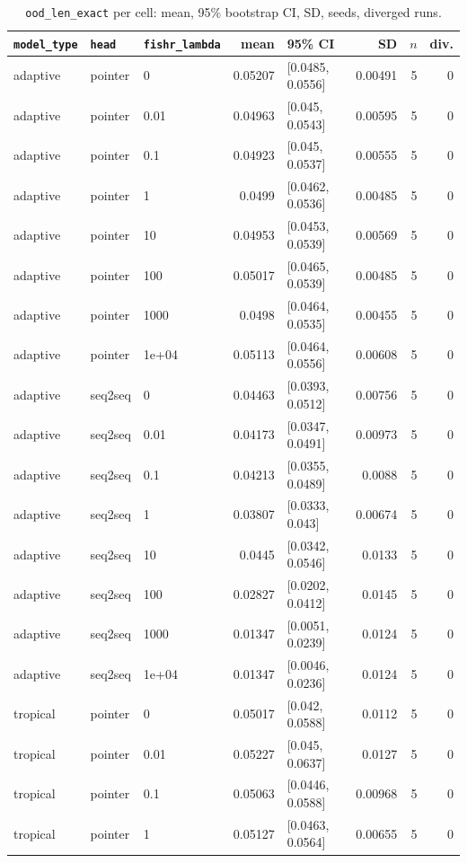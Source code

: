 \documentclass[10pt]{article}
\begin{document}
{\small
\begin{longtable}{lllrlrrr}
\caption{\texttt{ood\_len\_exact} per cell: mean, 95\% bootstrap CI, SD, seeds, diverged runs.}\label{tab:summary-ood_len_exact}\\
\toprule
\texttt{model\_type} & \texttt{head} & \texttt{fishr\_lambda} & mean & 95\% CI & SD & $n$ & div.\\
\midrule
\endhead
adaptive & pointer & 0 & 0.05207 & [0.0485, 0.0556] & 0.00491 & 5 & 0\\
adaptive & pointer & 0.01 & 0.04963 & [0.045, 0.0543] & 0.00595 & 5 & 0\\
adaptive & pointer & 0.1 & 0.04923 & [0.045, 0.0537] & 0.00555 & 5 & 0\\
adaptive & pointer & 1 & 0.0499 & [0.0462, 0.0536] & 0.00485 & 5 & 0\\
adaptive & pointer & 10 & 0.04953 & [0.0453, 0.0539] & 0.00569 & 5 & 0\\
adaptive & pointer & 100 & 0.05017 & [0.0465, 0.0539] & 0.00485 & 5 & 0\\
adaptive & pointer & 1000 & 0.0498 & [0.0464, 0.0535] & 0.00455 & 5 & 0\\
adaptive & pointer & 1e+04 & 0.05113 & [0.0464, 0.0556] & 0.00608 & 5 & 0\\
adaptive & seq2seq & 0 & 0.04463 & [0.0393, 0.0512] & 0.00756 & 5 & 0\\
adaptive & seq2seq & 0.01 & 0.04173 & [0.0347, 0.0491] & 0.00973 & 5 & 0\\
adaptive & seq2seq & 0.1 & 0.04213 & [0.0355, 0.0489] & 0.0088 & 5 & 0\\
adaptive & seq2seq & 1 & 0.03807 & [0.0333, 0.043] & 0.00674 & 5 & 0\\
adaptive & seq2seq & 10 & 0.0445 & [0.0342, 0.0546] & 0.0133 & 5 & 0\\
adaptive & seq2seq & 100 & 0.02827 & [0.0202, 0.0412] & 0.0145 & 5 & 0\\
adaptive & seq2seq & 1000 & 0.01347 & [0.0051, 0.0239] & 0.0124 & 5 & 0\\
adaptive & seq2seq & 1e+04 & 0.01347 & [0.0046, 0.0236] & 0.0124 & 5 & 0\\
tropical & pointer & 0 & 0.05017 & [0.042, 0.0588] & 0.0112 & 5 & 0\\
tropical & pointer & 0.01 & 0.05227 & [0.045, 0.0637] & 0.0127 & 5 & 0\\
tropical & pointer & 0.1 & 0.05063 & [0.0446, 0.0588] & 0.00968 & 5 & 0\\
tropical & pointer & 1 & 0.05127 & [0.0463, 0.0564] & 0.00655 & 5 & 0\\

\end{longtable}}
\end{document}
